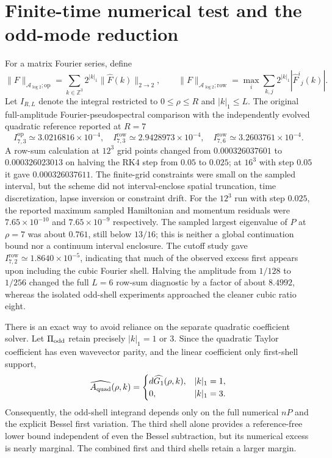 \documentclass[11pt,a4paper]{article}
\theoremstyle{remark}
\newcommand{\A}{\mathcal A_{\log 2}}
\newcommand{\op}{\mathrm{op}}
\newcommand{\row}{\mathrm{row}}
\begin{document}
\section{Finite-time numerical test and the odd-mode reduction}
For a matrix Fourier series, define
\begin{equation}\label{eq:norms}
\|F\|_{\A;\op}=\sum_{k\in\mathbb Z^3}2^{|k|_1}
\|\widehat F(k)\|_{2\to2},\qquad
\|F\|_{\A;\row}=\max_i\sum_{k,j}2^{|k|_1}|\widehat F^i{}_j(k)|.
\end{equation}
Let $I_{R,L}$ denote the integral restricted to $0\leq\rho\leq R$ and $|k|_1\leq L$. The original full-amplitude Fourier-pseudospectral comparison with the independently evolved quadratic reference reported at $R=7$
\begin{equation}\label{eq:originaltest}
I_{7,3}^{\op}\simeq3.0216816\times10^{-4},\quad
I_{7,3}^{\row}\simeq2.9428973\times10^{-4},\quad
I_{7,6}^{\row}\simeq3.2603761\times10^{-4}.
\end{equation}
A row-sum calculation at $12^3$ grid points changed from $0.000326037601$ to $0.000326023013$ on halving the RK4 step from $0.05$ to $0.025$; at $16^3$ with step $0.05$ it gave $0.000326037611$. The finite-grid constraints were small on the sampled interval, but the scheme did not interval-enclose spatial truncation, time discretization, lapse inversion or constraint drift. For the $12^3$ run with step $0.025$, the reported maximum sampled Hamiltonian and momentum residuals were $7.65\times10^{-10}$ and $7.65\times10^{-9}$ respectively. The sampled largest eigenvalue of $P$ at $\rho=7$ was about $0.761$, still below $13/16$; this is neither a global continuation bound nor a continuum interval enclosure. The cutoff study gave $I_{7,2}^{\row}\simeq1.8640\times10^{-5}$, indicating that much of the observed excess first appears upon including the cubic Fourier shell. Halving the amplitude from $1/128$ to $1/256$ changed the full $L=6$ row-sum diagnostic by a factor of about $8.4992$, whereas the isolated odd-shell experiments approached the cleaner cubic ratio eight.

There is an exact way to avoid reliance on the separate quadratic coefficient solver. Let $\Pi_{\rm odd}$ retain precisely $|k|_1=1$ or $3$. Since the quadratic Taylor coefficient has even wavevector parity, and the linear coefficient only first-shell support,
\begin{equation}\label{eq:oddref}
\widehat{A_{\rm quad}}(\rho,k)=
\begin{cases}
d\widehat{G_1}(\rho,k),&|k|_1=1,\\
0,&|k|_1=3.
\end{cases}
\end{equation}
Consequently, the odd-shell integrand depends only on the full numerical $nP$ and the explicit Bessel first variation. The third shell alone provides a reference-free lower bound independent of even the Bessel subtraction, but its numerical excess is nearly marginal. The combined first and third shells retain a larger margin.
\end{document}
